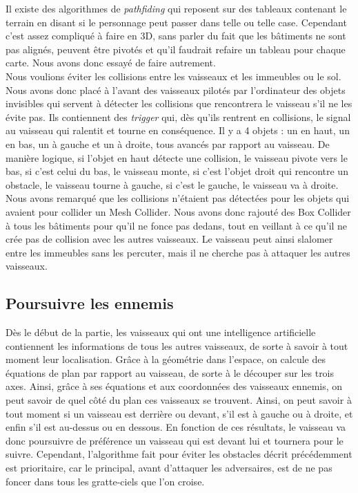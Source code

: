 \documentclass[12pt, titlepage]{article}
\begin{document}
\begin{spacing}{1.5}
Il existe des algorithmes de \textit{pathfiding} qui reposent sur des tableaux contenant le terrain en disant si le personnage peut passer dans telle ou telle case. Cependant c'est assez compliqué à faire en 3D, sans parler du fait que les bâtiments ne sont pas alignés, peuvent être pivotés et qu'il faudrait refaire un tableau pour chaque carte. Nous avons donc essayé de faire autrement.\\

Nous voulions éviter les collisions entre les vaisseaux et les immeubles ou le sol. Nous avons donc placé à l'avant des vaisseaux pilotés par l'ordinateur des objets invisibles qui servent à détecter les collisions que rencontrera le vaisseau s'il ne les évite pas. Ils contiennent des \textit{trigger} qui, dès qu'ils rentrent en collisions, le signal au vaisseau qui ralentit et tourne en conséquence. Il y a 4 objets : un en haut, un en bas, un à gauche et un à droite, tous avancés par rapport au vaisseau. De manière logique, si l'objet en haut détecte une collision, le vaisseau pivote vers le bas, si c'est celui du bas, le vaisseau monte, si c'est l'objet droit qui rencontre un obstacle, le vaisseau tourne à gauche, si c'est le gauche, le vaisseau va à droite.\\

Nous avons remarqué que les collisions n'étaient pas détectées pour les objets qui avaient pour collider un Mesh Collider. Nous avons  donc rajouté des Box Collider à tous les bâtiments pour qu’il ne fonce pas dedans, tout en veillant à ce qu'il ne crée  pas de collision avec les autres vaisseaux. Le vaisseau peut ainsi slalomer entre les immeubles sans les percuter, mais il ne cherche pas à attaquer les autres vaisseaux.\\

\subsection{Poursuivre les ennemis}

Dès le début de la partie, les vaisseaux qui ont une intelligence artificielle contiennent les informations de tous les autres vaisseaux, de sorte à savoir à tout moment leur localisation. Grâce à la géométrie dans l'espace, on calcule des équations de plan par rapport au vaisseau, de sorte à le découper sur les trois axes. Ainsi, grâce à ses équations et aux coordonnées des vaisseaux ennemis, on peut savoir de quel côté du plan ces vaisseaux se trouvent. Ainsi, on peut savoir à tout moment si un vaisseau est derrière ou devant, s'il est à gauche ou à droite, et enfin s'il est au-dessus ou en dessous. En fonction de ces résultats, le vaisseau va donc poursuivre de préférence un vaisseau qui est devant lui et tournera pour le suivre. Cependant, l'algorithme fait pour éviter les obstacles décrit précédemment est prioritaire, car le principal, avant d'attaquer les adversaires, est de ne pas foncer dans tous les gratte-ciels que l'on croise.


\end{spacing}
\end{document}
